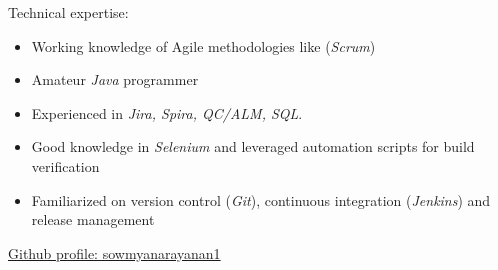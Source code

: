 
\inlineheadsection  %
  {Technical expertise:}
 {
 \emph{}
  \begin{itemize}
      \item  Working knowledge of Agile methodologies like (\emph{Scrum})
      \item Amateur \emph{Java} programmer
      \item Experienced in \emph{Jira, Spira, QC/ALM, SQL}.
      \item Good knowledge in \emph{Selenium} and leveraged automation scripts for build verification
      \item Familiarized on version control (\emph{Git}), continuous integration (\emph{Jenkins}) and release management
  \end{itemize}
  }
\vspace{0.5em}

\inlineheadsection
  {\href{https://github.com/sowmyanarayanan1}{Github profile: sowmyanarayanan1}}
  {}